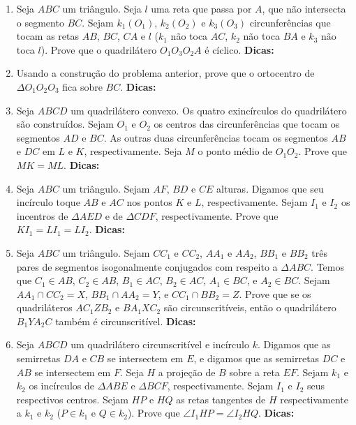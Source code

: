 \documentclass{article}
\newcommand{\dica}{\textbf{Dicas:}}
\newcommand{\iniTri}{Seja $ABC$ um triângulo}
\begin{document}
\begin{multicols}{2}
\begin{enumerate}
    \item \iniTri. Seja $l$ uma reta que passa por $A$, que não intersecta o segmento $BC$. Sejam $k_1(O_1)$, $k_2(O_2)$ e $k_3(O_3)$ circunferências que tocam as retas $AB$, $BC$, $CA$ e $l$ ($k_1$ não toca $AC$, $k_2$ não toca $BA$ e $k_3$ não toca $l$). Prove que o quadrilátero $O_1O_3O_2A$ é cíclico. \dica %
    
    \item Usando a construção do problema anterior, prove que o ortocentro de $\Delta O_1O_2O_3$ fica sobre $BC$. \dica %
    
    \item Seja $ABCD$ um quadrilátero convexo. Os quatro exincírculos do quadrilátero são construídos. Sejam $O_1$ e $O_2$ os centros das circunferências que tocam os segmentos $AD$ e $BC$. As outras duas circunferências tocam os segmentos $AB$ e $DC$ em $L$ e $K$, respectivamente. Seja $M$ o ponto médio de $O_1O_2$. Prove que $MK=ML$. \dica %
    
    \item \iniTri. Sejam $AF$, $BD$ e $CE$ alturas. Digamos que seu incírculo toque $AB$ e $AC$ nos pontos $K$ e $L$, respectivamente. Sejam $I_1$ e $I_2$ os incentros de $\Delta AED$ e de $\Delta CDF$, respectivamente. Prove que $KI_1=LI_1=LI_2$. \dica %
    
    \item \iniTri. Sejam $CC_1$ e $CC_2$, $AA_1$ e $AA_2$, $BB_1$ e $BB_2$ três pares de segmentos isogonalmente conjugados com respeito a $\Delta ABC$. Temos que $C_1\in AB$, $C_2\in AB$, $B_1\in AC$, $B_2\in AC$, $A_1\in BC$, e $A_2\in BC$. Sejam $AA_1\cap CC_2=X$, $BB_1\cap AA_2=Y$, e $CC_1\cap BB_2=Z$. Prove que se os quadriláteros $AC_1ZB_2$ e $BA_1XC_2$ são circunscritíveis, então o quadrilátero $B_1YA_2C$ também é circunscritível. \dica %
    
    \item Seja $ABCD$ um quadrilátero circunscritível e incírculo $k$. Digamos que as semirretas $DA$ e $CB$ se intersectem em $E$, e digamos que as semirretas $DC$ e $AB$ se intersectem em $F$. Seja $H$ a projeção de $B$ sobre a reta $EF$. Sejam $k_1$ e $k_2$ os incírculos de $\Delta ABE$ e $\Delta BCF$, respectivamente. Sejam $I_1$ e $I_2$ seus respectivos centros. Sejam $HP$ e $HQ$ as retas tangentes de $H$ respectivamente a $k_1$ e $k_2$ ($P\in k_1$ e $Q\in k_2$). Prove que $\angle I_1HP=\angle I_2HQ$. \dica %
    
    
    
    
    
    
    
    
    
    
    
\end{enumerate}
\end{multicols}
\end{document}
